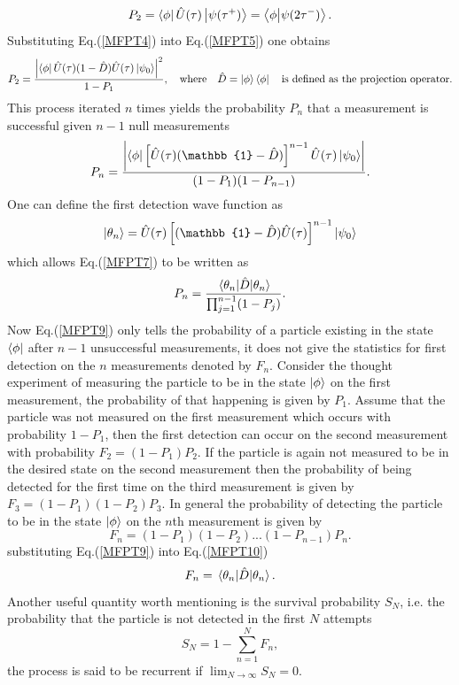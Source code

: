 \documentclass{article}
\numberwithin{equation}{section}
\newcommand{\1}{\mathbb{1}}
\newcommand{\state}{\ket{\phi}}
\newcommand{\projection}{\bra{\phi}}
\begin{document}
\begin{equation}\label{MFPT5}
    P_2=\projection \hat{U}(\tau)\ket{\psi(\tau^+)}=\projection\ket{\psi(2\tau^-)}.
\end{equation}
Substituting Eq.(\ref{MFPT4}) into Eq.(\ref{MFPT5}) one obtains
\begin{equation}\label{MFPT6}
    P_2=\frac{\abs{\projection\hat{U}(\tau)(1-\hat{D})\hat{U}(\tau)\ket{\psi_0}}^2}{1-P_1}, \quad \text{where}\quad \hat{D}=\state\projection \quad \text{is defined as the projection operator.}
\end{equation}
This process iterated $n$ times yields the probability $P_n$ that a measurement is successful given $n-1$ null measurements
\begin{equation}\label{MFPT7}
    P_n=\frac
    {\abs
    {\projection \left[\hat{U}(\tau)(\1-\hat{D})\right]^{n-1}\hat{U}(\tau)\ket{\psi_0}}}
    {(1-P_1)(1-P_{n-1})}.
\end{equation}
One can define the first detection wave function as
\begin{equation}\label{MFPT8}
    \ket{\theta_n}=\hat{U}(\tau)\left[(\1-\hat{D})\hat{U}(\tau)\right]^{n-1}\ket{\psi_0}
\end{equation}
which allows Eq.(\ref{MFPT7}) to be written as
\begin{equation}\label{MFPT9}
    P_n=\frac
    {\ev{\hat{D}}{\theta_n}}
    {\prod_{j=1}^{n-1}(1-P_j)}.
\end{equation}
Now Eq.(\ref{MFPT9}) only tells the probability of a particle existing in the state $\projection$ after $n-1$ unsuccessful measurements, it does not give the statistics for first detection on the $n$ measurements denoted by $F_n$. Consider the thought experiment of measuring the particle to be in the state $\ket{\phi}$ on the first measurement, the probability of that happening is given by $P_1$. Assume that the particle was not measured on the first measurement which occurs with probability $1-P_1$, then the first detection can occur on the second measurement with probability $F_2=(1-P_1)P_2$. If the particle is again not measured to be in the desired state on the second measurement then the probability of being detected for the first time on the third measurement is given by $F_3=(1-P_1)(1-P_2)P_3$. In general the probability of detecting the particle to be in the state $\ket{\phi}$ on the $n$th measurement is given by 
\begin{equation}\label{MFPT10}
    F_n=(1-P_1)(1-P_2)...(1-P_{n-1})P_n.
\end{equation}
substituting Eq.(\ref{MFPT9}) into Eq.(\ref{MFPT10}) 
\begin{equation}\label{MFPT11}
    F_n=\ev{\hat{D}}{\theta_n}.
\end{equation}
Another useful quantity worth mentioning is the survival probability $S_N$, i.e. the probability that the particle is not detected in the first $N$ attempts
\begin{equation}
    S_N=1-\sum_{n=1}^NF_n,
\end{equation}
the process is said to be recurrent if $\lim_{N\to\infty}S_N=0$.
\end{document}
